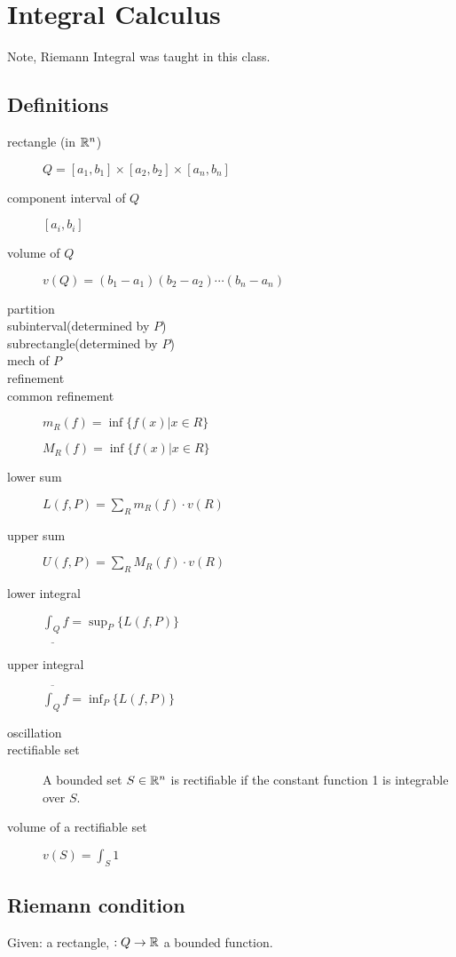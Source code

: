\section{Integral Calculus}
Note, Riemann Integral was taught in this class.


\subsection{Definitions}
\begin{description}
\item[rectangle (in ${\mathbb R}^n$)] $Q = [a_1,b_1]\times[a_2,b_2]\times[a_n,b_n]$
\item[component interval of $Q$] $[a_i,b_i]$
\item[volume of $Q$] $v(Q) = (b_1-a_1)(b_2-a_2)\cdots(b_n-a_n)$
\item[partition] \TODO
\item[subinterval(determined by $P$)] \OMIT
\item[subrectangle(determined by $P$)] \OMIT
\item[mech of $P$] \OMIT
\item[refinement] \OMIT
\item[common refinement] \OMIT
\item[\NAMEMISSING] $m_R(f)=\inf\{f(x)|x\in R\}$
\item[\NAMEMISSING] $M_R(f)=\inf\{f(x)|x\in R\}$
\item[lower sum] $L(f, P)=\sum_R m_R(f)\cdot v(R)$
\item[upper sum] $U(f, P)=\sum_R M_R(f)\cdot v(R)$
\item[lower integral] $\underline{\int_Q}f=\sup_P\{L(f,P)\}$
\item[upper integral] $\overline{\int_Q}f=\inf_P\{L(f,P)\}$
\item[oscillation] \TODO
\item[rectifiable set] A bounded set $S\in{\mathbb R}^n$ is rectifiable if the constant function 1 is integrable over $S$.
\item[volume of a rectifiable set] $v(S)=\int_S 1$
\end{description}


\subsection{Riemann condition}
Given:  a rectangle,  $: Q\to {\mathbb R}$ a bounded function.

